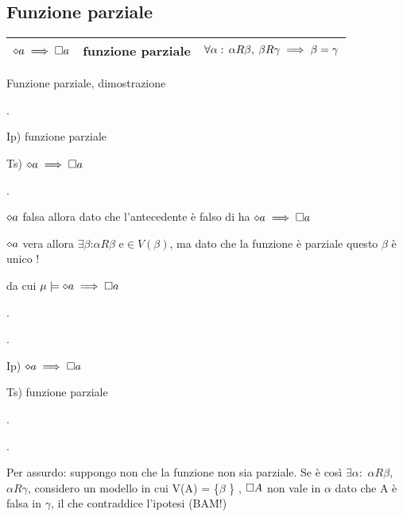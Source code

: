 \begin{center}
\begin{center}   \end{center}
\par\end{center}

$ $


\subsection{Funzione parziale}

\begin{tabular}{|c|c|c|}
\hline 
$\diamond a\implies\square a$  & funzione parziale  & $\forall\alpha:\,\alpha R\beta,\:\beta R\gamma\implies\beta=\gamma$\tabularnewline
\hline 
\end{tabular}

Funzione parziale, dimostrazione

.

Ip) funzione parziale

Ts) $\diamond a\implies\square a$ 

.

$\diamond a$ falsa allora dato che l'antecedente è falso di ha $\diamond a\implies\square a$

$\diamond a$ vera allora $\exists\beta$:$\alpha R\beta$ e$\in V(\beta)$,
ma dato che la funzione è parziale questo $\beta$ è unico !

da cui $\mu\models\diamond a\implies\square a$

.

.

Ip) $\diamond a\implies\square a$ 

Ts) funzione parziale

.

.

Per assurdo: suppongo non che la funzione non sia parziale. Se è così
$\exists\alpha:$ $\alpha R\beta,$ $\alpha R\gamma$, considero un
modello in cui V(A) = \{$\beta$ \} , $\square A$ non vale in $\alpha$
dato che A è falsa in $\gamma$, il che contraddice l'ipotesi (BAM!)\\
 \\
 


